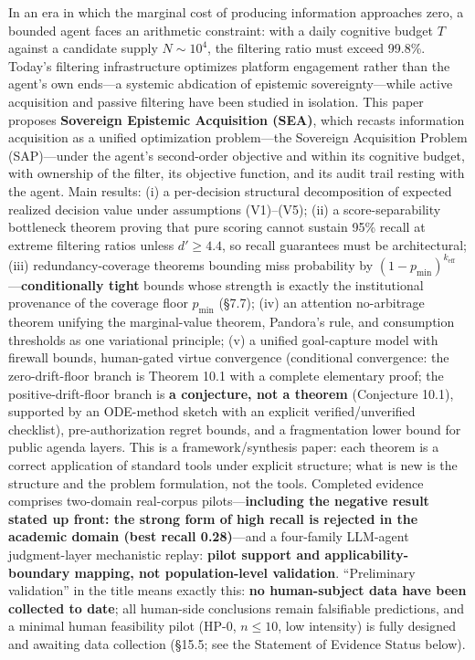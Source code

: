 \documentclass[
  11pt]{article}
\begin{document}
In an era in which the marginal cost of producing information approaches
zero, a bounded agent faces an arithmetic constraint: with a daily
cognitive budget \(T\) against a candidate supply \(N \sim 10^4\), the
filtering ratio must exceed 99.8\%. Today's filtering infrastructure
optimizes platform engagement rather than the agent's own ends---a
systemic abdication of epistemic sovereignty---while active acquisition
and passive filtering have been studied in isolation. This paper
proposes \textbf{Sovereign Epistemic Acquisition (SEA)}, which recasts
information acquisition as a unified optimization problem---the
Sovereign Acquisition Problem (SAP)---under the agent's second-order
objective and within its cognitive budget, with ownership of the filter,
its objective function, and its audit trail resting with the agent. Main
results: (i) a per-decision structural decomposition of expected
realized decision value under assumptions (V1)--(V5); (ii) a
score-separability bottleneck theorem proving that pure scoring cannot
sustain 95\% recall at extreme filtering ratios unless \(d' \ge 4.4\),
so recall guarantees must be architectural; (iii) redundancy-coverage
theorems bounding miss probability by
\((1-p_{\min})^{k_{\mathrm{eff}}}\)---\textbf{conditionally tight}
bounds whose strength is exactly the institutional provenance of the
coverage floor \(p_{\min}\) (§7.7); (iv) an attention no-arbitrage
theorem unifying the marginal-value theorem, Pandora's rule, and
consumption thresholds as one variational principle; (v) a unified
goal-capture model with firewall bounds, human-gated virtue convergence
(conditional convergence: the zero-drift-floor branch is Theorem 10.1
with a complete elementary proof; the positive-drift-floor branch is
\textbf{a conjecture, not a theorem} (Conjecture 10.1), supported by an
ODE-method sketch with an explicit verified/unverified checklist),
pre-authorization regret bounds, and a fragmentation lower bound for
public agenda layers. This is a framework/synthesis paper: each theorem
is a correct application of standard tools under explicit structure;
what is new is the structure and the problem formulation, not the tools.
Completed evidence comprises two-domain real-corpus
pilots---\textbf{including the negative result stated up front: the
strong form of high recall is rejected in the academic domain (best
recall 0.28)}---and a four-family LLM-agent judgment-layer mechanistic
replay: \textbf{pilot support and applicability-boundary mapping, not
population-level validation}. ``Preliminary validation'' in the title
means exactly this: \textbf{no human-subject data have been collected to
date}; all human-side conclusions remain falsifiable predictions, and a
minimal human feasibility pilot (HP-0, \(n \le 10\), low intensity) is
fully designed and awaiting data collection (§15.5; see the Statement of
Evidence Status below).
\end{document}
